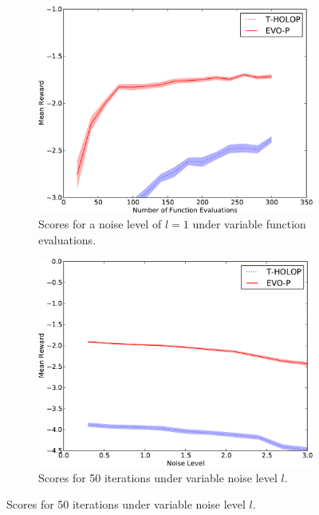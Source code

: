 \documentclass[conference]{IEEEtran}
\begin{document}
        \begin{figure}[ht]

        \begin{subfigure}[b]{0.32\textwidth}
                \centering
                \includegraphics[width=1.0\textwidth]{graphics/online-DI-crop.pdf}
                \caption{Scores for a noise level of $l=1$ under variable function evaluations.}
                \label{fig:DI}
        \end{subfigure}   \begin{subfigure}[b]{0.32\textwidth}
                \centering
                \includegraphics[width=1.0\textwidth]{graphics/online-noise-DI_50-crop.pdf}
                  \caption{Scores for 50 iterations under variable noise level $l$. }

\end{subfigure}
\end{figure}
\end{document}
